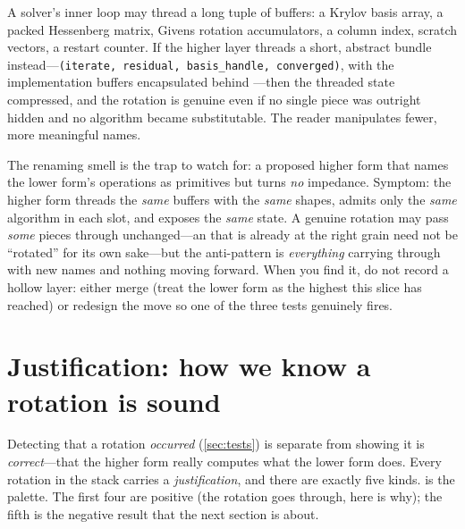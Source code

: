 A solver's inner loop may thread a long tuple of buffers: a Krylov basis array,
a packed Hessenberg matrix, Givens rotation accumulators, a column index, scratch
vectors, a restart counter. If the higher layer threads a short, abstract bundle
instead---\lstinline[style=l4style]|(iterate, residual, basis_handle, converged)|,
with the implementation buffers encapsulated behind ---then
the threaded state compressed, and the rotation is genuine even if no single
piece was outright hidden and no algorithm became substitutable. The reader
manipulates fewer, more meaningful names.

\begin{pitfall}
The renaming smell is the trap to watch for: a proposed higher form that names
the lower form's operations as primitives but turns \emph{no} impedance. Symptom:
the higher form threads the \emph{same} buffers with the \emph{same} shapes,
admits only the \emph{same} algorithm in each slot, and exposes the \emph{same}
state. A genuine rotation may pass \emph{some} pieces through unchanged---an
 that is already at the right grain need not be ``rotated'' for its own
sake---but the anti-pattern is \emph{everything} carrying through with new names
and nothing moving forward. When you find it, do not record a hollow layer:
either merge (treat the lower form as the highest this slice has reached) or
redesign the move so one of the three tests genuinely fires.
\end{pitfall}

\section{Justification: how we know a rotation is sound}
\label{sec:justification}

Detecting that a rotation \emph{occurred} (\cref{sec:tests}) is separate from
showing it is \emph{correct}---that the higher form really computes what the lower
form does. Every rotation in the stack carries a \emph{justification}, and there
are exactly five kinds.  is the palette. The first four
are positive (the rotation goes through, here is why); the fifth is the negative
result that the next section is about.

